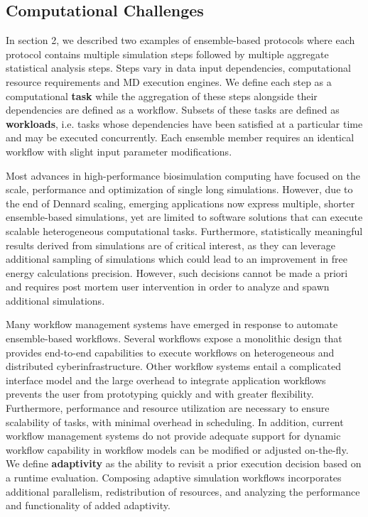 \subsection{Computational Challenges}

	In section 2, we described two examples of ensemble-based protocols 
where each protocol contains multiple simulation steps followed by 
multiple aggregate statistical analysis steps. Steps vary in data input 
dependencies, computational resource requirements and MD execution engines. 
We define each step as a computational \textbf{task}  while the aggregation of these 
steps alongside their dependencies are defined as a workflow. Subsets of these 
tasks are defined as \textbf{workloads}, i.e. tasks whose dependencies have been 
satisfied at a particular time and may be executed concurrently. Each ensemble 
member requires an identical workflow with slight input parameter modifications. 

	Most advances in high-performance biosimulation computing have 
focused on the scale, performance and optimization of single long simulations. 
However, due to the end of Dennard scaling, emerging applications now express 
multiple, shorter ensemble-based simulations, yet are limited to software 
solutions that can execute scalable heterogeneous computational tasks. Furthermore,
statistically meaningful results derived from simulations are of critical interest,
as they can leverage additional sampling of simulations which could lead to an  
improvement in free energy calculations precision. However, such decisions cannot 
be made a priori and requires post mortem user intervention in order to analyze and 
spawn additional simulations.


	Many workflow management systems have emerged in response to automate ensemble-based 
workflows. Several workflows expose a monolithic design that provides
end-to-end capabilities to execute workflows on heterogeneous and distributed
cyberinfrastructure. Other workflow systems entail a complicated interface model
and the large overhead to integrate application workflows prevents the user from 
prototyping quickly and with greater flexibility. Furthermore, performance and 
resource utilization are necessary to ensure scalability of tasks, with minimal 
overhead in scheduling. In addition, current workflow management systems do not 
provide adequate support for dynamic workflow capability in workflow models  
can be modified or adjusted on-the-fly. We define \textbf{adaptivity} as the ability to 
revisit a prior execution decision based on a runtime evaluation. Composing adaptive
simulation workflows incorporates additional parallelism, redistribution of 
resources, and analyzing the performance and functionality of added adaptivity. 

